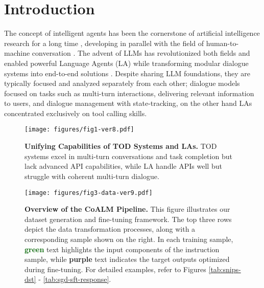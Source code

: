 \section{Introduction}




The concept of intelligent agents has been the cornerstone of artificial intelligence research for a long time \cite{Minsky1986-MINTSO}, developing in parallel with the field of human-to-machine conversation \cite{young02_icslp}. The advent of LLMs \cite{Achiam2023GPT4TR, Dubey2024TheL3-llama3} has revolutionized both fields and enabled powerful Language Agents (LA) \cite{schick2024toolformer} while transforming modular dialogue systems into end-to-end solutions \cite{hudecek-dusek-2023-large}. Despite sharing LLM foundations, they are typically focused and analyzed separately from each other; dialogue models focused on tasks such as multi-turn interactions, delivering relevant information to users, and dialogue management with state-tracking, on the other hand LAs concentrated exclusively on tool calling skills.

\begin{figure}[t!]
\texttt{[image: figures/fig1-ver8.pdf]}
\caption{\textbf{Unifying Capabilities of TOD Systems and LAs.} TOD systems excel in multi-turn conversations and task completion but lack advanced API capabilities, while LA handle APIs well but struggle with coherent multi-turn dialogue.}
\vspace{-5mm}
\label{fig:conv-agent}
\end{figure}

\begin{figure*}[t!]
\texttt{[image: figures/fig3-data-ver9.pdf]}
\caption{\textbf{Overview of the CoALM Pipeline.} This figure illustrates our dataset generation and fine-tuning framework. The top three rows depict the data transformation processes, along with a corresponding sample shown on the right. In each training sample, \textbf{\textcolor{darkgreen}{green}} text highlights the input components of the instruction sample, while \textbf{\textcolor{mypurple}{purple}} text indicates the target outputs optimized during fine-tuning. For detailed examples, refer to Figures \ref{tab:snips-dst} - \ref{tab:sgd-sft-response}.}
\vspace{-2.0ex}
\label{fig:summary}
\end{figure*}


